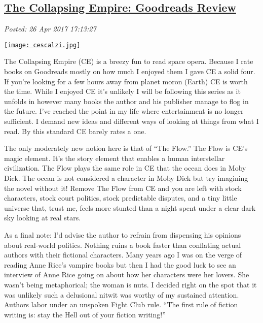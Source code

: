 %

\subsection*{\href{http://analyzethedatanotthedrivel.org/2017/04/26/the-collapsing-empire-goodreads-review/}{The Collapsing Empire: Goodreads Review}}


\noindent\emph{Posted: 26 Apr 2017 17:13:27}
\vspace{6pt}


\captionsetup[floatingfigure]{labelformat=empty}
\begin{floatingfigure}[r]{0.28\textwidth}
\centering
\href{https://www.goodreads.com/book/show/29939160-the-collapsing-empire}{\texttt{[image: cescalzi.jpg]}}
\label{fig:5368X0}
\end{floatingfigure}
The Collapsing Empire (CE) is a breezy fun to read space opera. Because I
rate books on Goodreads mostly on how much I enjoyed them I gave CE a
solid four. If you're looking for a few hours away from planet moron
(Earth) CE is worth the time. While I enjoyed CE it's unlikely I will be
following this series as it unfolds in however many books the author and
his publisher manage to flog in the future. I've reached the point in my
life where entertainment is no longer sufficient. I demand new ideas and
different ways of looking at things from what I read. By this standard
CE barely rates a one.

The only moderately new notion here is that of ``The Flow.'' The Flow is
CE's magic element. It's the story element that enables a human
interstellar civilization. The Flow plays the same role in CE that the
ocean does in Moby Dick. The ocean is not considered a character in Moby
Dick but try imagining the novel without it! Remove The Flow from CE and
you are left with stock characters, stock court politics, stock
predictable disputes, and a tiny little universe that, trust me, feels
more stunted than a night spent under a clear dark sky looking at real
stars.

As a final note: I'd advise the author to refrain from dispensing his
opinions about real-world politics. Nothing ruins a book faster than
conflating actual authors with their fictional characters. Many years
ago I was on the verge of reading Anne Rice's vampire books but then I
had the good luck to see an interview of Anne Rice going on about how
her characters were her lovers. She wasn't being metaphorical; the woman
is nuts. I decided right on the spot that it was unlikely such a
delusional nitwit was worthy of my sustained attention. Authors labor
under an unspoken Fight Club rule. ``The first rule of fiction writing
is: stay the Hell out of your fiction writing!''



%